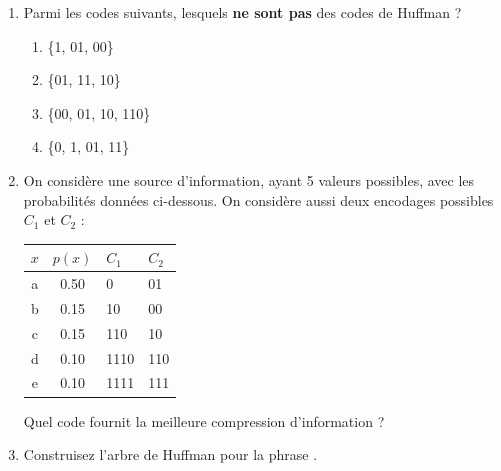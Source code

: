 \documentclass [a4paper, 11pt] {article}
\begin{document}
    \begin{exercice}{3}
      
        \begin{enumerate}
            \item Parmi les codes suivants, lesquels \textbf{ne sont pas} des codes de Huffman ?
            \begin{enumerate}
                \item \{1, 01, 00\}
                \item \{01, 11, 10\}
                \item \{00, 01, 10, 110\}
                \item \{0, 1, 01, 11\}
            \end{enumerate}
            \item On considère une source d’information, ayant 5 valeurs possibles, avec les probabilités données ci-dessous. On considère aussi deux encodages possibles $C_1$ et $C_2$ :
            \begin{center}
            \begin{tabular}{c|c|ll}
                 $x$ & $p(x)$ & $C_1$ & $C_2$ \\
                 \hline
                 a & 0.50 & 0 & 01\\
                 b & 0.15 & 10 & 00\\
                 c & 0.15 & 110 & 10\\
                 d & 0.10 & 1110 & 110\\
                 e & 0.10 & 1111 & 111\\
            \end{tabular}
            \end{center}
            Quel code fournit la meilleure compression d'information ?
            \item Construisez l'arbre de Huffman pour la phrase .
        \end{enumerate} 
    \end{exercice}
    
\end{document}
